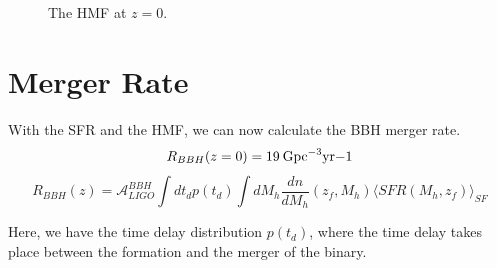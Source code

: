 \begin{figure}
    \centering
    \caption{The HMF at $z=0$.}
\end{figure} 

\section{Merger Rate}

With the SFR and the HMF, we can now calculate the BBH merger rate.
\begin{equation}
    R_{BBH}(z=0) = 19 \:\rm{Gpc}^{-3}\rm{yr}{-1}
\end{equation}
\begin{equation}
    R_{BBH}(z)=\mathcal{A}_{LIGO}^{BBH}\int dt_d p(t_d) \int dM_h \frac{dn}{dM_h}(z_f, M_h)\langle SFR(M_h, z_f)\rangle_{SF}
    \label{BBH_merger_equation}
\end{equation}

Here, we have the time delay distribution $p(t_d)$, where the time delay takes place between the formation and the merger of the binary. 

